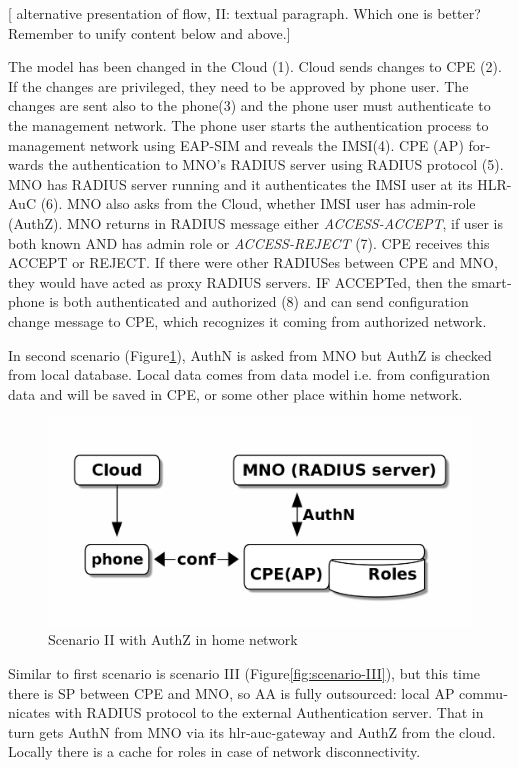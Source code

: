 \documentclass[12pt,a4paper,english]{tutthesis}
\begin{document}
\begin{otherlanguage}{english}
[ alternative presentation of flow, II: textual paragraph. Which one
is better? Remember to unify content below and above.] 

The model has been changed in the Cloud (1). Cloud sends changes to CPE
(2).  If the changes are privileged, they need to be approved by phone
user. The changes are sent also to the phone(3) and the phone user must
authenticate  to the management network.  The phone user starts the
authentication process to management network using EAP-SIM and reveals
the IMSI(4).  CPE (AP) forwards  the authentication to MNO's RADIUS server
using RADIUS protocol (5).  MNO has RADIUS server running and it
authenticates the IMSI user at its HLR-AuC (6). MNO also asks from
the Cloud, whether IMSI user has admin-role (AuthZ). 
MNO returns in RADIUS message either \emph{ACCESS-ACCEPT}, if
user is both known AND has admin role or \emph{ACCESS-REJECT} (7).  CPE
receives this ACCEPT or REJECT. If there were other RADIUSes between
CPE and MNO, they would have acted as proxy RADIUS servers.  IF
ACCEPTed, then the smartphone is both authenticated and authorized (8) and can
send configuration change message to CPE, which recognizes it coming
from authorized network.



\label{scenario-ii}

In second scenario (Figure\ref{fig:scenario-II}), AuthN is asked from MNO but
AuthZ is checked from local database. Local data comes from data model
i.e. from configuration data and will be saved in CPE, or some other
place within home network.


\begin{figure}[htb]
\centering
\includegraphics[width=.9\linewidth]{scenII.png}
\caption{\label{fig:scenario-II}Scenario II with AuthZ in home network}
\end{figure}


\label{scenario-iii}

Similar to first scenario is scenario III (Figure\ref{fig:scenario-III}), 
but this time there is SP between CPE and MNO, so AA is fully outsourced:
local AP communicates with RADIUS protocol to the external
Authentication server. That in turn gets AuthN from MNO via its
hlr-auc-gateway and AuthZ from the cloud.
Locally there is a cache for roles in case of network disconnectivity.


\end{otherlanguage}
\end{document}
